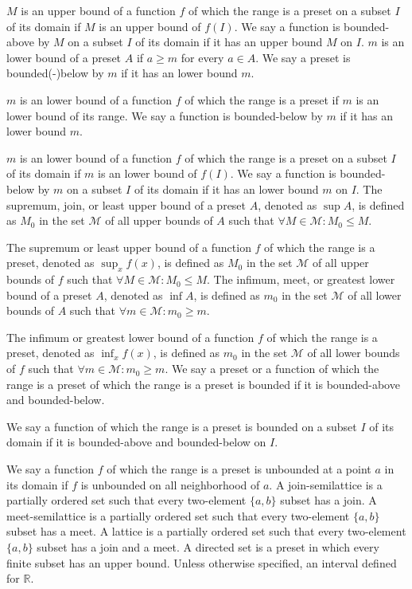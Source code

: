 \documentclass[a4paper,12pt]{article}
\begin{document}
$M$ is an upper bound of a function $f$ of which the range is a preset on a subset $I$ of its domain if $M$ is an upper bound of $f(I)$. We say a function is bounded-above by $M$ on a subset $I$ of its domain if it has an upper bound $M$ on $I$.
$m$ is an lower bound of a preset $A$ if $a\geq m$ for every $a\in A$. We say a preset is bounded(-)below by $m$ if it has an lower bound $m$.

$m$ is an lower bound of a function $f$ of which the range is a preset if $m$ is an lower bound of its range. We say a function is bounded-below by $m$ if it has an lower bound $m$.

$m$ is an lower bound of a function $f$ of which the range is a preset on a subset $I$ of its domain if $m$ is an lower bound of $f(I)$. We say a function is bounded-below by $m$ on a subset $I$ of its domain if it has an lower bound $m$ on $I$.
The supremum, join, or least upper bound of a preset $A$, denoted as $\sup A$, is defined as $M_0$ in the set $\mathcal{M}$ of all upper bounds of $A$ such that $\forall M\in\mathcal{M}\colon M_0\leq M$.

The supremum or least upper bound of a function $f$ of which the range is a preset, denoted as $\sup_xf(x)$, is defined as $M_0$ in the set $\mathcal{M}$ of all upper bounds of $f$ such that $\forall M\in\mathcal{M}\colon M_0\leq M$.
The infimum, meet, or greatest lower bound of a preset $A$, denoted as $\inf A$, is defined as $m_0$ in the set $\mathcal{M}$ of all lower bounds of $A$ such that $\forall m\in\mathcal{M}\colon m_0\geq m$.

The infimum or greatest lower bound of a function $f$ of which the range is a preset, denoted as $\inf_xf(x)$, is defined as $m_0$ in the set $\mathcal{M}$ of all lower bounds of $f$ such that $\forall m\in\mathcal{M}\colon m_0\geq m$.
We say a preset or a function of which the range is a preset of which the range is a preset is bounded if it is bounded-above and bounded-below.

We say a function of which the range is a preset is bounded on a subset $I$ of its domain if it is bounded-above and bounded-below on $I$.

We say a function $f$ of which the range is a preset is unbounded at a point $a$ in its domain if $f$ is unbounded on all neighborhood of $a$.
A join-semilattice is a partially ordered set such that every two-element $\{a,b\}$ subset has a join.
A meet-semilattice is a partially ordered set such that every two-element $\{a,b\}$ subset has a meet.
A lattice is a partially ordered set such that every two-element $\{a,b\}$ subset has a join and a meet.
A directed set is a preset in which every finite subset has an upper bound.
Unless otherwise specified, an interval defined for $\mathbb{R}$.
\end{document}

